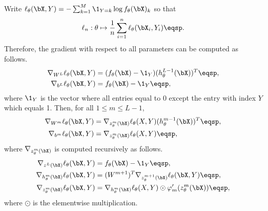 \begin{shaded}
\begin{proposition}
\label{prop:backpropagation:classif}
Write $\ell_{\theta}(\bX,Y) =  -\sum_{k=1}^{M} \1_{Y=k}\log f_{\theta}(\bX)_k$ so that 
$$
\ell_n:\theta \mapsto \frac{1}{n} \sum_{i=1}^n \ell_{\theta}(\bX_i,Y_i)\eqsp. 
$$
Therefore, the gradient with respect to all parameters can be computed as follows.
\begin{align*}
\nabla_{W^L} \ell_{\theta}(\bX,Y) &= (f_{\theta}(\bX) - \1_Y)(h_{\theta}^{L-1}(\bX))^T\eqsp,\\
\nabla_{b^L} \ell_{\theta}(\bX,Y) &= f_{\theta}(\bX) - \1_Y\eqsp,
\end{align*}
where $\1_Y$ is the vector where all entries equal to 0 except the entry with index $Y$ which equals 1. Then, for all $1\leqslant m\leqslant L-1$,
\begin{align*}
\nabla_{W^m} \ell_{\theta}(\bX,Y) &= \nabla_{z_{\theta}^m(\bX)}\ell_{\theta}(X,Y)(h_{\theta}^{m-1}(\bX))^T\eqsp,\\
\nabla_{b^m} \ell_{\theta}(\bX,Y) &=  \nabla_{z_{\theta}^m(\bX)}\ell_{\theta}(X,Y)\eqsp,
\end{align*}
where $\nabla_{z_{\theta}^m(\bX)}$ is computed recursively as follows.
\begin{align*}
\nabla_{z^L(\bX)} \ell_{\theta}(\bX,Y) &= f_{\theta}(\bX) - \1_Y\eqsp,\\
\nabla_{h_{\theta}^m(\bX)} \ell_{\theta}(\bX,Y) &= (W^{m+1})^T\nabla_{z_{\theta}^{m+1}(\bX)} \ell_{\theta}(\bX,Y) \eqsp,\\
\nabla_{z_{\theta}^m(\bX)} \ell_{\theta}(\bX,Y) &= \nabla_{h_{\theta}^m(\bX)}\ell_{\theta}(X,Y) \odot \varphi_m'(z_{\theta}^{m}(\bX))\eqsp,
\end{align*}
where $\odot$ is the elementwise multiplication.
\end{proposition}
\end{shaded}
